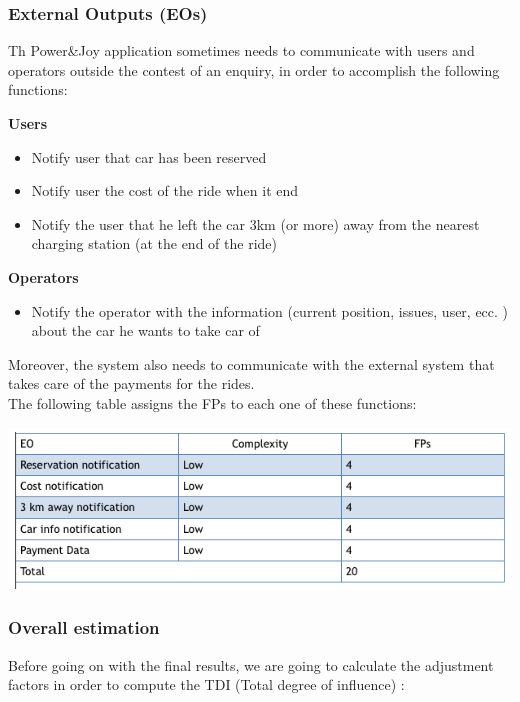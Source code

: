 \documentclass{article}
\begin{document}
\begin{flushleft}
\subsubsection{External Outputs (EOs)} %
Th Power\&Joy application sometimes needs to communicate with users and operators outside the contest of an enquiry, in order to accomplish the following functions:

\textbf{Users}
\begin{itemize}
\item Notify user that car has been reserved 
\item Notify user the cost of the ride when it end
\item Notify the user that he left the car 3km (or more) away from the nearest charging station (at the end of the ride)

\end{itemize}


\textbf{Operators}
\begin{itemize}
\item Notify the operator with the information (current position, issues, user, ecc. ) about the car he wants to take car of
\end{itemize}

Moreover, the system also needs to communicate with the external system that takes care of the payments for the rides. \\
The following table assigns the FPs to each one of these functions:

\includegraphics[scale=0.5]{EO}



\newpage
\subsubsection{Overall estimation} %

Before going on with the final results, we are going to calculate the adjustment factors in order to compute the TDI (Total degree of influence) :


\end{flushleft}
\end{document}
